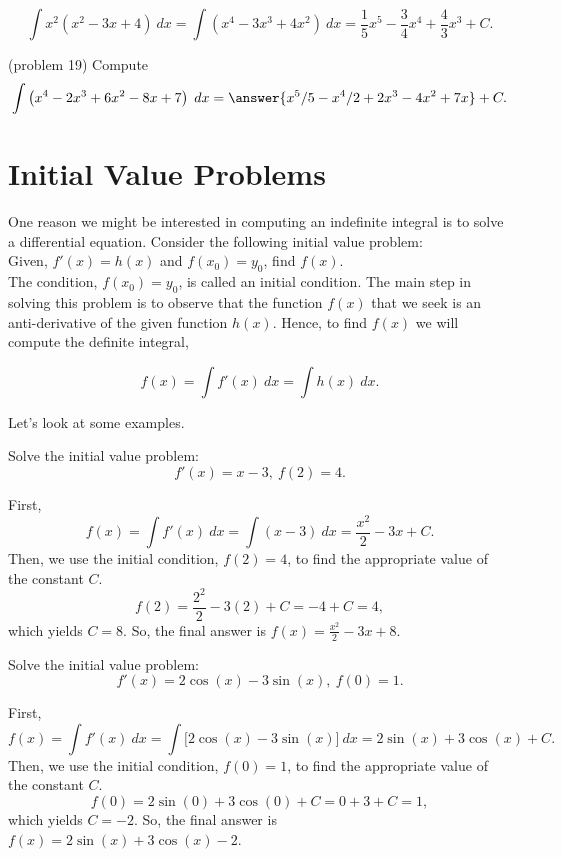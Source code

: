 \documentclass[handout]{ximera}
\begin{document}
\begin{example}[example 19]
\[
\int x^2(x^2 - 3x + 4) \ dx = \int (x^4 - 3x^3 + 4x^2) \ dx = \frac15 x^5 - \frac{3}{4}x^4 + \frac43 x^3 + C.
\]

\end{example}

\begin{problem}(problem 19)
Compute
\[
\int \left(x^4 - 2x^3 + 6x^2 - 8x + 7 \right) \; dx = \answer{ x^5/5 - x^4/2 + 2x^3 - 4x^2 + 7x} + C.
\]
\end{problem}





\section{Initial Value Problems}


One reason we might be interested in computing an indefinite integral is to solve a differential equation. Consider the following initial value problem:\\
Given, $f'(x) = h(x)$ and $f(x_0) = y_0$, find $f(x)$.\\
The condition, $f(x_0) = y_0$, is called an initial condition. The main step in solving this problem is to observe that the function $f(x)$ that we seek is an anti-derivative of the given function $h(x)$. Hence, to find $f(x)$ we will compute the definite integral, 

\[f(x) = \int f'(x) \ dx = \int h(x) \ dx.\]

Let's look at some examples.

\begin{example}[example 20]
Solve the initial value problem:
\[f'(x) = x - 3, \ f(2) = 4.\]

First, 
\[f(x) = \int f'(x) \ dx = \int (x-3)  \ dx = \frac{x^2}{2} - 3x + C.\]
Then, we use the initial condition, $f(2) = 4$, to find the 
appropriate value of the constant $C$.
\[f(2) = \frac{2^2}{2} - 3(2) + C = -4 + C = 4,\]
which yields $C = 8$.
So, the final answer is  $f(x) = \frac{x^2}{2} -3x + 8.$
\end{example}

\begin{example}[example 21]
Solve the initial value problem:
\[f'(x) = 2\cos(x) -3\sin(x), \ f(0) = 1.\]

First, 
\[f(x) = \int f'(x) \ dx = \int \big[2\cos(x) -3\sin(x)\big]  \ dx =
 2\sin(x) + 3\cos(x) + C.\]
Then, we use the initial condition, $f(0) = 1$, to find the 
appropriate value of the constant $C$.
\[f(0) = 2\sin(0) + 3\cos(0) + C = 0 + 3 + C = 1,\]
which yields $C = -2$.
So, the final answer is  $f(x) = 2\sin(x) + 3\cos(x)-2.$
\end{example}
\end{document}
